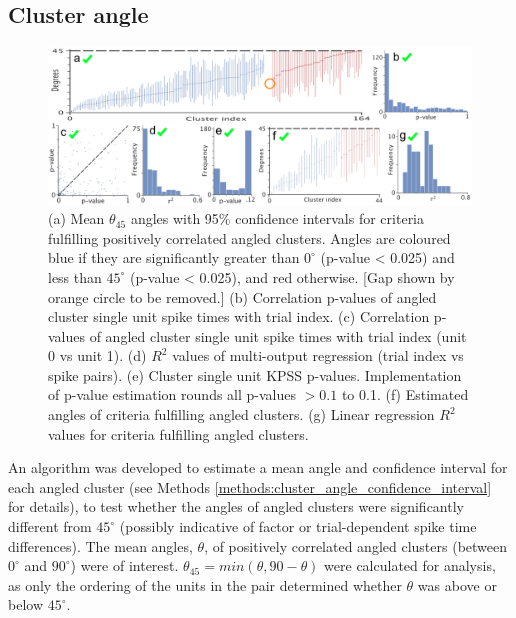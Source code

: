 \documentclass{article}
\begin{document}


\subsection*{Cluster angle}
\label{results:cluster_angle}

\begin{figure}[t!]
\centering
\includegraphics[width=\textwidth]{Figure4.pdf}
\caption{(a) Mean $\theta_{45}$ angles with 95\% confidence intervals for criteria fulfilling positively correlated angled clusters. Angles are coloured blue if they are significantly greater than $0^{\circ}$ (p-value < 0.025) and less than $45^{\circ}$ (p-value < 0.025), and red otherwise. [Gap shown by orange circle to be removed.] (b) Correlation p-values of angled cluster single unit spike times with trial index. (c) Correlation p-values of angled cluster single unit spike times with trial index (unit 0 vs unit 1). (d) $R^2$ values of multi-output regression (trial index vs spike pairs). (e) Cluster single unit KPSS p-values. Implementation of p-value estimation rounds all p-values $>0.1$ to 0.1. (f) Estimated angles of criteria fulfilling angled clusters. (g) Linear regression $R^2$ values for criteria fulfilling angled clusters.}
\label{fig:universe}
\end{figure}

An algorithm was developed to estimate a mean angle and confidence interval for each angled cluster (see Methods \ref{methods:cluster_angle_confidence_interval} for details), to test whether the angles of angled clusters were significantly different from $45^{\circ}$ (possibly indicative of factor or trial-dependent spike time differences). The mean angles, $\theta$, of positively correlated angled clusters (between $0^{\circ}$ and $90^{\circ}$) were of interest. $\theta_{45} = min(\theta, 90-\theta)$ were calculated for analysis, as only the ordering of the units in the pair determined whether $\theta$ was above or below $45^{\circ}$.
\end{document}
